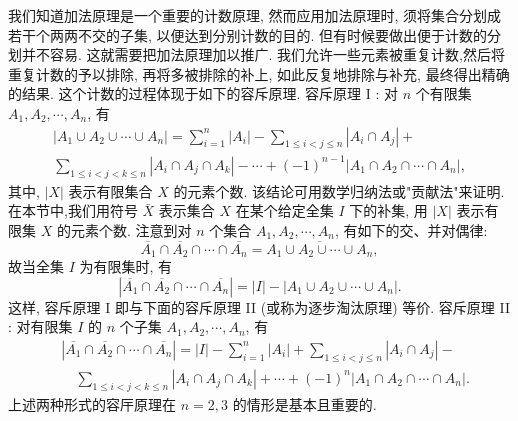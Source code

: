 
我们知道加法原理是一个重要的计数原理, 然而应用加法原理时, 须将集合分划成若干个两两不交的子集, 以便达到分别计数的目的.
但有时候要做出便于计数的分划并不容易.
这就需要把加法原理加以推广.
我们允许一些元素被重复计数,然后将重复计数的予以排除, 再将多被排除的补上, 如此反复地排除与补充, 最终得出精确的结果.
这个计数的过程体现于如下的容斥原理.
容斥原理 I : 对 $n$ 个有限集 $A_1, A_2, \cdots, A_n$, 有
$$
\begin{gathered}
\left|A_1 \cup A_2 \cup \cdots \cup A_n\right|=\sum_{i=1}^n\left|A_i\right|-\sum_{1 \leqslant i<j \leqslant n}\left|A_i \cap A_j\right|+ \\
\sum_{1 \leqslant i<j<k \leqslant n}\left|A_i \cap A_j \cap A_k\right|-\cdots+(-1)^{n-1}\left|A_1 \cap A_2 \cap \cdots \cap A_n\right|,
\end{gathered}
$$
其中, $|X|$ 表示有限集合 $X$ 的元素个数.
该结论可用数学归纳法或"贡献法"来证明.
在本节中,我们用符号 $\bar{X}$ 表示集合 $X$ 在某个给定全集 $I$ 下的补集, 用 $|X|$ 表示有限集 $X$ 的元素个数.
注意到对 $n$ 个集合 $A_1, A_2, \cdots, A_n$, 有如下的交、并对偶律:
$$
\overline{A_1} \cap \overline{A_2} \cap \cdots \cap \overline{A_n}=\overline{A_1 \cup A_2 \cup \cdots \cup A_n},
$$
故当全集 $I$ 为有限集时, 有
$$
\left|\overline{A_1} \cap \overline{A_2} \cap \cdots \cap \overline{A_n}\right|=|I|-\left|A_1 \cup A_2 \cup \cdots \cup A_n\right| .
$$
这样, 容斥原理 I 即与下面的容斥原理 II (或称为逐步淘汰原理) 等价.
容斥原理 II : 对有限集 $I$ 的 $n$ 个子集 $A_1, A_2, \cdots, A_n$, 有
$$
\begin{aligned}
& \left|\overline{A_1} \cap \overline{A_2} \cap \cdots \cap \overline{A_n}\right|=|I|-\sum_{i=1}^n\left|A_i\right|+\sum_{1 \leqslant i<j \leqslant n}\left|A_i \cap A_j\right|- \\
& \quad \sum_{1 \leqslant i<j<k \leqslant n}\left|A_i \cap A_j \cap A_k\right|+\cdots+(-1)^n\left|A_1 \cap A_2 \cap \cdots \cap A_n\right| .
\end{aligned}
$$
上述两种形式的容厈原理在 $n=2,3$ 的情形是基本且重要的.



